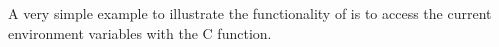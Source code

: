 %
%
%
%
A very simple example to illustrate the functionality of \NB is to access the current environment variables with the  C function.
